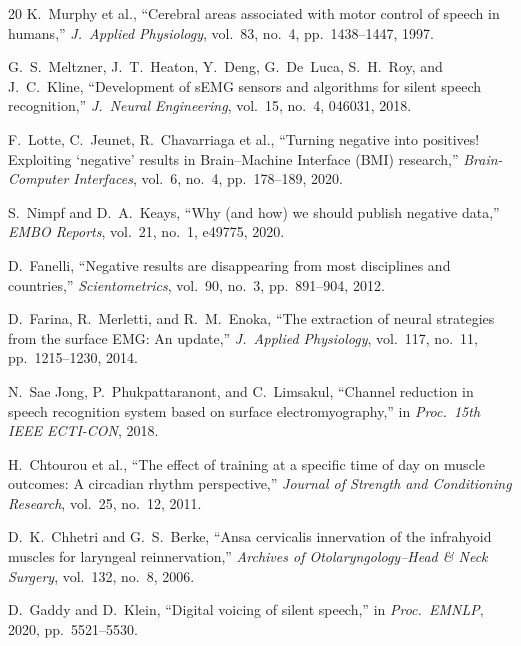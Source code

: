 \documentclass{article}
\begin{document}
\begin{thebibliography}{20}
K.\ Murphy et al., ``Cerebral areas associated with motor control of speech in humans,'' \emph{J.\ Applied Physiology}, vol.~83, no.~4, pp.\ 1438--1447, 1997.

G.~S.\ Meltzner, J.~T.\ Heaton, Y.\ Deng, G.\ De~Luca, S.~H.\ Roy, and J.~C.\ Kline, ``Development of sEMG sensors and algorithms for silent speech recognition,'' \emph{J.\ Neural Engineering}, vol.~15, no.~4, 046031, 2018.

F.\ Lotte, C.\ Jeunet, R.\ Chavarriaga et al., ``Turning negative into positives! Exploiting `negative' results in Brain--Machine Interface (BMI) research,'' \emph{Brain-Computer Interfaces}, vol.~6, no.~4, pp.\ 178--189, 2020.

S.\ Nimpf and D.~A.\ Keays, ``Why (and how) we should publish negative data,'' \emph{EMBO Reports}, vol.~21, no.~1, e49775, 2020.

D.\ Fanelli, ``Negative results are disappearing from most disciplines and countries,'' \emph{Scientometrics}, vol.~90, no.~3, pp.\ 891--904, 2012.

D.\ Farina, R.\ Merletti, and R.~M.\ Enoka, ``The extraction of neural strategies from the surface EMG: An update,'' \emph{J.\ Applied Physiology}, vol.~117, no.~11, pp.\ 1215--1230, 2014.

N.\ Sae Jong, P.\ Phukpattaranont, and C.\ Limsakul, ``Channel reduction in speech recognition system based on surface electromyography,'' in \emph{Proc.\ 15th IEEE ECTI-CON}, 2018.

H.\ Chtourou et al., ``The effect of training at a specific time of day on muscle outcomes: A circadian rhythm perspective,'' \emph{Journal of Strength and Conditioning Research}, vol.\ 25, no.\ 12, 2011.

D.~K.\ Chhetri and G.~S.\ Berke, ``Ansa cervicalis innervation of the infrahyoid muscles for laryngeal reinnervation,'' \emph{Archives of Otolaryngology--Head \& Neck Surgery}, vol.\ 132, no.\ 8, 2006.

D.\ Gaddy and D.\ Klein, ``Digital voicing of silent speech,'' in \emph{Proc.\ EMNLP}, 2020, pp.\ 5521--5530.

\end{thebibliography}
\end{document}
